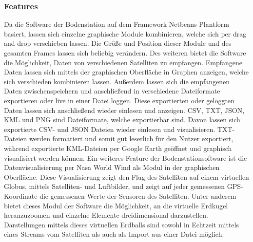 \subsubsection{Features}
Da die Software der Bodenstation auf dem Framework Netbeans Plantform basiert, lassen sich einzelne graphische Module kombinieren, welche sich per drag and drop verschieben lassen. Die Größe und Position dieser Module und des gesamten Frames lassen sich beliebig verändern. Des weiteren bietet die Software die Möglichkeit, Daten von verschiedenen Satelliten zu empfangen. Empfangene Daten lassen sich mittels der graphischen Oberfläche in Graphen anzeigen, welche sich verschieden kombinieren lassen. Außerdem lassen sich die empfangenen Daten zwischenspeichern und anschließend in verschiedene Dateiformate exportieren oder live in einer Datei loggen. Diese exportierten oder geloggten Daten lassen sich anschließend wieder einlesen und anzeigen. CSV, TXT, JSON, KML und PNG sind Dateiformate, welche exportierbar sind. Davon lassen sich exportierte CSV- und JSON Dateien wieder einlesen und visualisieren. TXT-Dateien werden formatiert und somit gut leserlich für den Nutzer exportiert, während exportierte KML-Dateien per Google Earth geöffnet und graphisch visualisiert werden können. Ein weiteres Feature der Bodenstationsoftware ist die Datenvisualisierung per Nasa World Wind als Modul in der graphischen Oberfläche. Diese Visualisierung zeigt den Flug des Satelliten auf einem virtuellen Globus, mittels Satelliten- und Luftbilder, und zeigt auf jeder gemessenen GPS-Koordinate die gemessenen Werte der Sensoren des Satelliten. Unter anderem bietet dieses Modul der Software die Möglichkeit, an die virtuelle Erdkugel heranzuzoomen und einzelne Elemente dreidimensional darzustellen. Darstellungen mittels dieses virtuellen Erdballs sind sowohl in Echtzeit mittels eines Streams vom Satelliten als auch als Import aus einer Datei möglich.
